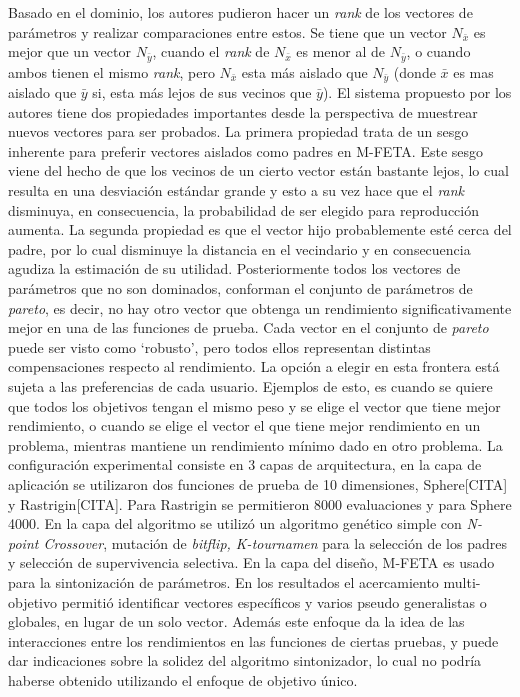 \documentclass[letter, 10pt]{article}
\begin{document}
\begin{multicols}{2}
Basado en el dominio, los autores pudieron hacer un \textit{rank} de los vectores de parámetros y realizar comparaciones entre estos. Se tiene que un vector $N_{\bar{x}}$ es mejor que un vector $N_{\bar{y}}$, cuando el \textit{rank} de $N_{\bar{x}}$ es menor al de $N_{\bar{y}}$, o cuando ambos tienen el mismo \textit{rank}, pero $N_{\bar{x}}$ esta más aislado que $N_{\bar{y}}$ (donde $\bar{x}$ es mas aislado que $\bar{y}$ si, esta más lejos de sus vecinos que $\bar{y}$). El sistema propuesto por los autores tiene dos propiedades importantes desde la perspectiva de muestrear nuevos vectores para ser probados. La primera propiedad trata de un sesgo inherente para preferir vectores aislados como padres en M-FETA. Este sesgo viene del hecho de que los vecinos de un cierto vector están bastante lejos, lo cual resulta en una desviación estándar grande y esto a su vez hace que el \textit{rank} disminuya, en consecuencia, la probabilidad de ser elegido para reproducción aumenta. La segunda propiedad es que el vector hijo probablemente esté cerca del padre, por lo cual disminuye la distancia en el vecindario y en consecuencia agudiza la estimación de su utilidad. Posteriormente todos los vectores de parámetros que no son dominados, conforman el conjunto de parámetros de \textit{pareto}, es decir, no hay otro vector que obtenga un rendimiento significativamente mejor en una de las funciones de prueba. Cada vector en el conjunto de \textit{pareto} puede ser visto como `robusto', pero todos ellos representan distintas compensaciones respecto al rendimiento. La opción a elegir en esta frontera está sujeta a las preferencias de cada usuario. Ejemplos de esto, es cuando se quiere que todos los objetivos tengan el mismo peso y se elige el vector que tiene mejor rendimiento, o cuando se elige el vector el que tiene mejor rendimiento en un problema, mientras mantiene un rendimiento mínimo dado en otro problema. La configuración experimental consiste en 3 capas de arquitectura, en la capa de aplicación se utilizaron dos funciones de prueba de 10 dimensiones, Sphere[CITA] y Rastrigin[CITA]. Para Rastrigin se permitieron 8000 evaluaciones y para Sphere 4000. En la capa del algoritmo se utilizó un algoritmo genético simple con \textit{N-point Crossover}, mutación de \textit{bitflip, K-tournamen} para la selección de los padres y selección de supervivencia selectiva. En la capa del diseño, M-FETA es usado para la sintonización de parámetros. En los resultados el acercamiento multi-objetivo permitió identificar vectores específicos y varios pseudo generalistas o globales, en lugar de un solo vector. Además este enfoque da la idea de las interacciones entre los rendimientos en las funciones de ciertas pruebas, y puede dar indicaciones sobre la solidez del algoritmo sintonizador, lo cual no podría haberse obtenido utilizando el enfoque de objetivo único.\\



\end{multicols}
\end{document}

